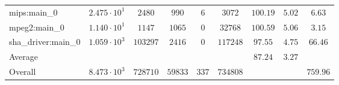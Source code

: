 \begin{tabular}{|l|c|c|c|c|c|c|c|c|}
mips:main\_0            & $ 2.475 \cdot 10^{1} $ & $ 2480   $ & $ 990   $ & $ 6   $ & $ 3072   $ & $ 100.19      $ & $ 5.02    $ & $ 6.63    $ \\
mpeg2:main\_0           & $ 1.140 \cdot 10^{1} $ & $ 1147   $ & $ 1065  $ & $ 0   $ & $ 32768  $ & $ 100.59      $ & $ 5.06    $ & $ 3.15    $ \\
sha\_driver:main\_0     & $ 1.059 \cdot 10^{3} $ & $ 103297 $ & $ 2416  $ & $ 0   $ & $ 117248 $ & $ 97.55       $ & $ 4.75    $ & $ 66.46   $ \\
\hline
Average                 & $                    $ & $        $ & $       $ & $     $ & $        $ & $ 87.24       $ & $ 3.27    $ & $         $ \\
\hline
Overall                 & $ 8.473 \cdot 10^{3} $ & $ 728710 $ & $ 59833 $ & $ 337 $ & $ 734808 $ & $             $ & $         $ & $ 759.96  $ \\
\hline
\end{tabular}
